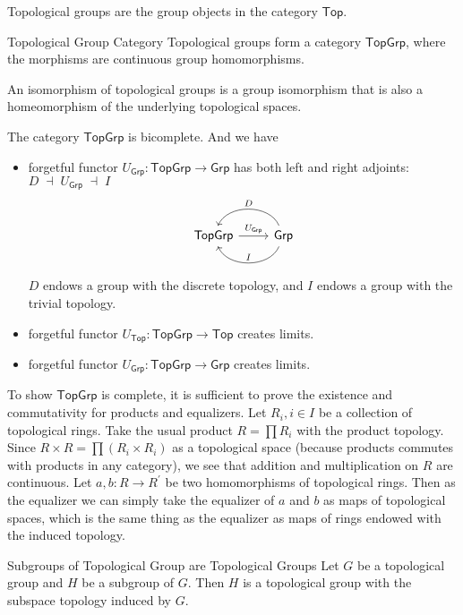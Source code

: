 \documentclass{report}
\begin{document}
\noindent Topological groups are the group objects in the category $\mathsf{Top}$.
\begin{definition}{Topological Group Category}{}
	Topological groups form a category $\mathsf{TopGrp}$, where the morphisms are continuous group homomorphisms.
\end{definition}


\noindent An isomorphism of topological groups is a group isomorphism that is also a homeomorphism of the underlying topological spaces.
\begin{proposition}{}{}
	The category $\mathsf{TopGrp}$ is bicomplete. And we have
	\begin{itemize}
		\item forgetful functor $U_{\mathsf{Grp}}:\mathsf{TopGrp}\to\mathsf{Grp}$ has both
		left and right adjoints: $D \;\dashv\; U_{\mathsf{Grp}} \;\dashv\; I$
		\[
		\begin{tikzcd}
		\mathsf{TopGrp} \arrow[r, "U_{\mathsf{Grp}}"] & \mathsf{Grp} \arrow[l, "D"', bend right=67] \arrow[l, "I"', bend left=67]
		\end{tikzcd}
		\]
		$D$ endows a group with the discrete topology, and $I$ endows a group with the trivial topology.
		\item forgetful functor $U_{\mathsf{Top}}:\mathsf{TopGrp}\to\mathsf{Top}$ creates limits.
		\item forgetful functor $U_{\mathsf{Grp}}:\mathsf{TopGrp}\to\mathsf{Grp}$ creates limits.
	\end{itemize}
\end{proposition}

\begin{prf}
	To show $\mathsf{TopGrp}$ is complete, it is sufficient to prove the existence and commutativity for products and equalizers. Let $R_i, i \in I$ be a collection of topological rings. Take the usual product $R=\prod R_i$ with the product topology. Since $R \times R=\prod\left(R_i \times R_i\right)$ as a topological space (because products commutes with products in any category), we see that addition and multiplication on $R$ are continuous. Let $a, b: R \rightarrow R^{\prime}$ be two homomorphisms of topological rings. Then as the equalizer we can simply take the equalizer of $a$ and $b$ as maps of topological spaces, which is the same thing as the equalizer as maps of rings endowed with the induced topology.
\end{prf}


\begin{proposition}{Subgroups of Topological Group are Topological Groups}{}
	Let $G$ be a topological group and $H$ be a subgroup of $G$. Then $H$ is a topological group with the subspace topology induced by $G$.
\end{proposition}
\end{document}
